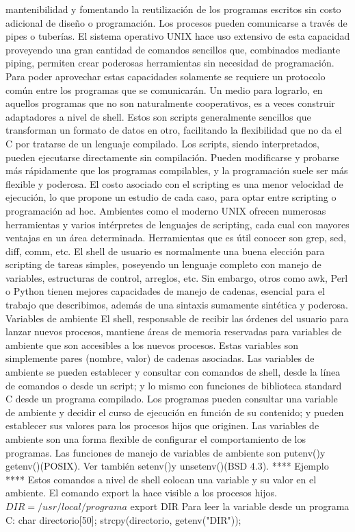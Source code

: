 mantenibilidad y fomentando la reutilización de los programas escritos sin
costo adicional de diseño o programación.
 Los procesos pueden comunicarse a través de pipes o tuberías. El sistema
 operativo UNIX hace uso extensivo de esta capacidad proveyendo una gran
 cantidad de comandos sencillos que, combinados mediante piping, permiten crear
 poderosas herramientas sin necesidad de programación.
Para poder aprovechar estas capacidades solamente se requiere un protocolo
común entre los programas que se comunicarán. Un medio para lograrlo, en
aquellos programas que no son naturalmente cooperativos, es a veces construir
adaptadores a nivel de shell. Estos son scripts generalmente sencillos que
transforman un formato de datos en otro, facilitando la flexibilidad que no da
el C por tratarse de un lenguaje compilado.
Los scripts, siendo interpretados, pueden ejecutarse directamente sin
compilación. Pueden modificarse y probarse más rápidamente que los programas
compilables, y la programación suele ser más flexible y poderosa. El costo
asociado con el scripting es una menor velocidad de ejecución, lo que propone
un estudio de cada caso, para optar entre scripting o programación ad hoc.
Ambientes como el moderno UNIX ofrecen numerosas herramientas y varios
intérpretes de lenguajes de scripting, cada cual con mayores ventajas en un
área determinada. Herramientas que es útil conocer son grep, sed, diff, comm,
etc. El shell de usuario es normalmente una buena elección para scripting de
tareas simples, poseyendo un lenguaje completo con manejo de variables,
estructuras de control, arreglos, etc. Sin embargo, otros como awk, Perl o
Python tienen mejores capacidades de manejo de cadenas, esencial para el
trabajo que describimos, además de una sintaxis sumamente sintética y poderosa.
Variables de ambiente
El shell, responsable de recibir las órdenes del usuario para lanzar nuevos
procesos, mantiene áreas de memoria reservadas para variables de ambiente que
son accesibles a los nuevos procesos. Estas variables son simplemente pares
(nombre, valor) de cadenas asociadas. Las variables de ambiente se pueden
establecer y consultar con comandos de shell, desde la línea de comandos o
desde un script; y lo mismo con funciones de biblioteca standard C desde un
programa compilado. Los programas pueden consultar una variable de ambiente y
decidir el curso de ejecución en función de su contenido; y pueden establecer
sus valores para los procesos hijos que originen. Las variables de ambiente son
una forma flexible de configurar el comportamiento de los programas.
Las funciones de manejo de variables de ambiente son putenv()y getenv()(POSIX).
Ver también setenv()y unsetenv()(BSD 4.3).
**** Ejemplo ****
Estos comandos a nivel de shell colocan una variable y su valor en el ambiente.
El comando export la hace visible a los procesos hijos.
$ DIR=/usr/local/programa
$ export DIR
Para leer la variable desde un programa C:
char directorio[50];
strcpy(directorio, getenv("DIR"));

